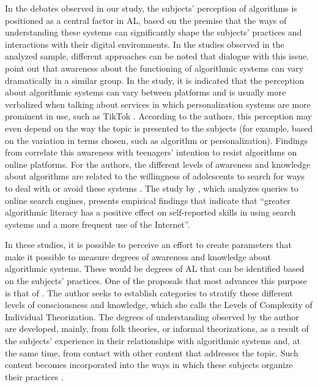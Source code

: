 In the debates observed in our study, the subjects' perception of algorithms is positioned as a central factor in AL, based on the premise that the ways of understanding these systems can significantly shape the subjects' practices and interactions with their digital environments. In the studies observed in the analyzed sample, different approaches can be noted that dialogue with this issue. \textcite{Bell2023} point out that awareness about the functioning of algorithmic systems can vary dramatically in a similar group. In the study, it is indicated that the perception about algorithmic systems can vary between platforms and is usually more verbalized when talking about services in which personalization systems are more prominent in use, such as TikTok \cite{Bell2023}. According to the authors, this perception may even depend on the way the topic is presented to the subjects (for example, based on the variation in terms chosen, such as algorithm or personalization). Findings from \textcite{Lv2022} correlate this awareness with teenagers' intention to resist algorithms on online platforms. For the authors, the different levels of awareness and knowledge about algorithms are related to the willingness of adolescents to search for ways to deal with or avoid these systems \cite{Lv2022}. The study by \textcite[p. 352]{Parnell2022}, which analyzes queries to online search engines, presents empirical findings that indicate that “greater algorithmic literacy has a positive effect on self-reported skills in using search systems and a more frequent use of the Internet”.

In these studies, it is possible to perceive an effort to create parameters that make it possible to measure degrees of awareness and knowledge about algorithmic systems. These would be degrees of AL that can be identified based on the subjects' practices. One of the proposals that most advances this purpose is that of \textcite{Devito2021}. The author seeks to establish categories to stratify these different levels of consciousness and knowledge, which she calls the Levels of Complexity of Individual Theorization. The degrees of understanding observed by the author are developed, mainly, from folk theories, or informal theorizations, as a result of the subjects’ experience in their relationships with algorithmic systems and, at the same time, from contact with other content that addresses the topic. Such content becomes incorporated into the ways in which these subjects organize their practices \cite{Devito2021}.

